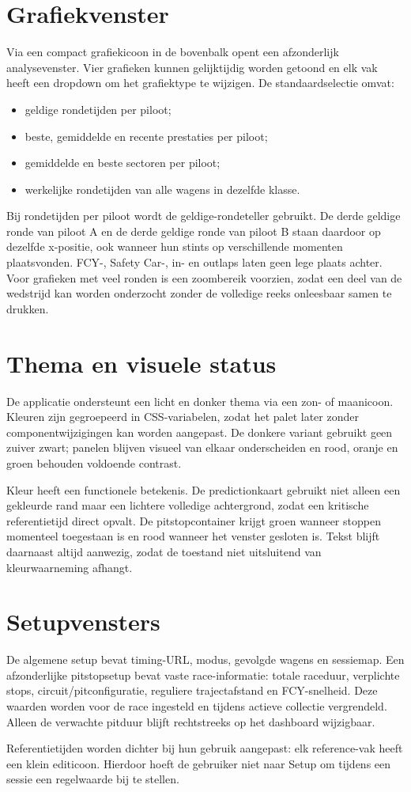 \section{Grafiekvenster}
Via een compact grafiekicoon in de bovenbalk opent een afzonderlijk analysevenster. Vier grafieken
kunnen gelijktijdig worden getoond en elk vak heeft een dropdown om het grafiektype te wijzigen. De
standaardselectie omvat:

\begin{itemize}
  \item geldige rondetijden per piloot;
  \item beste, gemiddelde en recente prestaties per piloot;
  \item gemiddelde en beste sectoren per piloot;
  \item werkelijke rondetijden van alle wagens in dezelfde klasse.
\end{itemize}

Bij rondetijden per piloot wordt de geldige-rondeteller gebruikt. De derde geldige ronde van piloot
A en de derde geldige ronde van piloot B staan daardoor op dezelfde x-positie, ook wanneer hun
stints op verschillende momenten plaatsvonden. FCY-, Safety Car-, in- en outlaps laten geen lege
plaats achter. Voor grafieken met veel ronden is een zoombereik voorzien, zodat een deel van de
wedstrijd kan worden onderzocht zonder de volledige reeks onleesbaar samen te drukken.

\section{Thema en visuele status}
De applicatie ondersteunt een licht en donker thema via een zon- of maanicoon. Kleuren zijn
gegroepeerd in CSS-variabelen, zodat het palet later zonder componentwijzigingen kan worden
aangepast. De donkere variant gebruikt geen zuiver zwart; panelen blijven visueel van elkaar
onderscheiden en rood, oranje en groen behouden voldoende contrast.

Kleur heeft een functionele betekenis. De predictionkaart gebruikt niet alleen een gekleurde rand
maar een lichtere volledige achtergrond, zodat een kritische referentietijd direct opvalt. De
pitstopcontainer krijgt groen wanneer stoppen momenteel toegestaan is en rood wanneer het venster
gesloten is. Tekst blijft daarnaast altijd aanwezig, zodat de toestand niet uitsluitend van
kleurwaarneming afhangt.

\section{Setupvensters}
De algemene setup bevat timing-URL, modus, gevolgde wagens en sessiemap. Een afzonderlijke
pitstopsetup bevat vaste race-informatie: totale raceduur, verplichte stops,
circuit/pitconfiguratie, reguliere trajectafstand en FCY-snelheid. Deze waarden worden voor de race
ingesteld en tijdens actieve collectie vergrendeld. Alleen de verwachte pitduur blijft rechtstreeks
op het dashboard wijzigbaar.

Referentietijden worden dichter bij hun gebruik aangepast: elk reference-vak heeft een klein
editicoon. Hierdoor hoeft de gebruiker niet naar Setup om tijdens een sessie een regelwaarde bij te
stellen.
